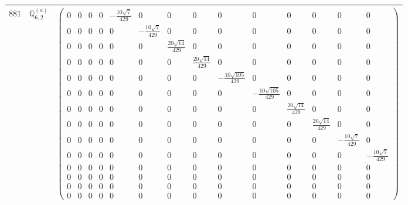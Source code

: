 \documentclass[fleqn,8pt,landscape]{jsarticle}
\begin{document}
\begin{center}
\begin{longtable}{ccc}
$ 881 $ & $ \mathbb{Q}_{6,2}^{(a)} $ & $ \begin{pmatrix} 0 & 0 & 0 & 0 & - \frac{10 \sqrt{7}}{429} & 0 & 0 & 0 & 0 & 0 & 0 & 0 & 0 & 0 \\ 0 & 0 & 0 & 0 & 0 & - \frac{10 \sqrt{7}}{429} & 0 & 0 & 0 & 0 & 0 & 0 & 0 & 0 \\ 0 & 0 & 0 & 0 & 0 & 0 & \frac{20 \sqrt{14}}{429} & 0 & 0 & 0 & 0 & 0 & 0 & 0 \\ 0 & 0 & 0 & 0 & 0 & 0 & 0 & \frac{20 \sqrt{14}}{429} & 0 & 0 & 0 & 0 & 0 & 0 \\ 0 & 0 & 0 & 0 & 0 & 0 & 0 & 0 & - \frac{10 \sqrt{105}}{429} & 0 & 0 & 0 & 0 & 0 \\ 0 & 0 & 0 & 0 & 0 & 0 & 0 & 0 & 0 & - \frac{10 \sqrt{105}}{429} & 0 & 0 & 0 & 0 \\ 0 & 0 & 0 & 0 & 0 & 0 & 0 & 0 & 0 & 0 & \frac{20 \sqrt{14}}{429} & 0 & 0 & 0 \\ 0 & 0 & 0 & 0 & 0 & 0 & 0 & 0 & 0 & 0 & 0 & \frac{20 \sqrt{14}}{429} & 0 & 0 \\ 0 & 0 & 0 & 0 & 0 & 0 & 0 & 0 & 0 & 0 & 0 & 0 & - \frac{10 \sqrt{7}}{429} & 0 \\ 0 & 0 & 0 & 0 & 0 & 0 & 0 & 0 & 0 & 0 & 0 & 0 & 0 & - \frac{10 \sqrt{7}}{429} \\ 0 & 0 & 0 & 0 & 0 & 0 & 0 & 0 & 0 & 0 & 0 & 0 & 0 & 0 \\ 0 & 0 & 0 & 0 & 0 & 0 & 0 & 0 & 0 & 0 & 0 & 0 & 0 & 0 \\ 0 & 0 & 0 & 0 & 0 & 0 & 0 & 0 & 0 & 0 & 0 & 0 & 0 & 0 \\ 0 & 0 & 0 & 0 & 0 & 0 & 0 & 0 & 0 & 0 & 0 & 0 & 0 & 0 \end{pmatrix} $ \\ \hline

\end{longtable}
\end{center}
\end{document}
